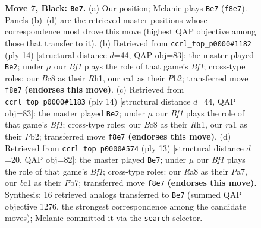 \documentclass[11pt]{article}
\begin{document}
\begin{figure}[p]
\caption{\textbf{Move 7, Black: \texttt{Be7}.} (a) Our position; Melanie plays \texttt{Be7} (\texttt{f8e7}). Panels (b)--(d) are the retrieved master positions whose correspondence most drove this move (highest QAP objective among those that transfer to it). (b) Retrieved from \texttt{ccrl\_top\_p0000\#1182} (ply 14) [structural distance $d$=44, QAP obj=83]: the master played \texttt{Be2}; under $\mu$ our \emph{Bf1} plays the role of that game's \emph{Bf1}; cross-type roles: our \emph{B}c8 as their \emph{R}h1, our \emph{r}a1 as their \emph{P}b2; transferred move \texttt{f8e7} \textbf{(endorses this move)}. (c) Retrieved from \texttt{ccrl\_top\_p0000\#1183} (ply 14) [structural distance $d$=44, QAP obj=83]: the master played \texttt{Be2}; under $\mu$ our \emph{Bf1} plays the role of that game's \emph{Bf1}; cross-type roles: our \emph{B}c8 as their \emph{R}h1, our \emph{r}a1 as their \emph{P}b2; transferred move \texttt{f8e7} \textbf{(endorses this move)}. (d) Retrieved from \texttt{ccrl\_top\_p0000\#574} (ply 13) [structural distance $d$=20, QAP obj=82]: the master played \texttt{Be7}; under $\mu$ our \emph{Bf1} plays the role of that game's \emph{Bf1}; cross-type roles: our \emph{R}a8 as their \emph{P}a7, our \emph{b}c1 as their \emph{P}b7; transferred move \texttt{f8e7} \textbf{(endorses this move)}. Synthesis: 16 retrieved analogs transferred to \texttt{Be7} (summed QAP objective 1276, the strongest correspondence among the candidate moves); Melanie committed it via the \texttt{search} selector.}
\label{fig:thought-m13}
\end{figure}

\clearpage
\end{document}

